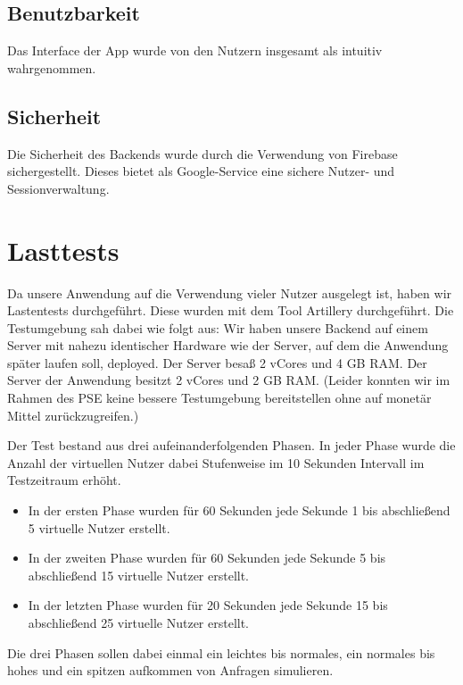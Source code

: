 \documentclass{qualitätssicherungsheft}
\begin{document}
\subsection{Benutzbarkeit}
Das Interface der App wurde von den Nutzern insgesamt als intuitiv wahrgenommen.

\subsection{Sicherheit}
Die Sicherheit des Backends wurde durch die Verwendung von Firebase sichergestellt. 
Dieses bietet als Google-Service eine sichere Nutzer- und Sessionverwaltung.

\section{Lasttests}
Da unsere Anwendung auf die Verwendung vieler Nutzer ausgelegt ist, haben wir Lastentests durchgeführt.
Diese wurden mit dem Tool Artillery durchgeführt.
Die Testumgebung sah dabei wie folgt aus:
Wir haben unsere Backend auf einem Server mit nahezu identischer Hardware wie der Server, auf dem die Anwendung später laufen soll, deployed.
Der Server besaß 2 vCores und 4 GB RAM.
Der Server der Anwendung besitzt 2 vCores und 2 GB RAM.
(Leider konnten wir im Rahmen des PSE keine bessere Testumgebung bereitstellen ohne auf monetär Mittel zurückzugreifen.)

Der Test bestand aus drei aufeinanderfolgenden Phasen.
In jeder Phase wurde die Anzahl der virtuellen Nutzer dabei Stufenweise im 10 Sekunden Intervall im Testzeitraum erhöht.
\begin{itemize}
    \item In der ersten Phase wurden für 60 Sekunden jede Sekunde 1 bis abschließend 5 virtuelle Nutzer erstellt.
    \item In der zweiten Phase wurden für 60 Sekunden jede Sekunde 5 bis abschließend 15 virtuelle Nutzer erstellt.
    \item In der letzten Phase wurden für 20 Sekunden jede Sekunde 15 bis abschließend 25 virtuelle Nutzer erstellt.
\end{itemize}

Die drei Phasen sollen dabei einmal ein leichtes bis normales, ein normales bis hohes und ein spitzen aufkommen von Anfragen simulieren.
\end{document}
